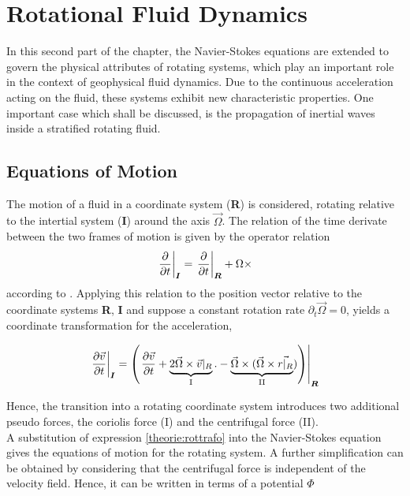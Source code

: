 \section{Rotational Fluid Dynamics}

In this second part of the chapter, the Navier-Stokes equations are extended to govern the physical attributes of rotating systems,
which play an important role in the context of geophysical fluid dynamics.
Due to the continuous acceleration acting on the fluid, these systems exhibit new characteristic properties.
One important case which shall be discussed, is the propagation of inertial waves inside a stratified rotating fluid.

\subsection{Equations of Motion}
\label{THEORIE:ROT}

The motion of a fluid in a coordinate system (\textbf{R}) is considered, rotating relative to the intertial system (\textbf{I}) around the axis $\vec{\Omega}$.
The relation of the time derivate between the two frames of motion is given by the operator relation
\begin{align}
    \left.{\pdn[]{t}}\right|_{\bm{I}} = \left.\pdn[]{t}\right|_{\bm{R}} + \Omega \times
\end{align}
according to \citep{Tilgner2007}.
Applying this relation to the position vector relative to the coordinate systems \textbf{R}, \textbf{I}
and suppose a constant rotation rate $\partial_t\vec{\Omega} = 0$, yields a coordinate transformation for the acceleration,

\begin{align}
    \label{theorie:rottrafo}
    \left.\pdn[\vec{v}]{t}\right|_{\bm{I}} = \left(\left.\pdn[\vec{v}]{t}  + \underbrace{2\vec{\Omega} \times \vec{v}|_R}_{\text{I}}.
    - \underbrace{\vec{\Omega} \times (\vec{\Omega} \times \vec{r|_R}}_{\text{II}})\right)\right|_{\bm{R}}
\end{align}

Hence, the transition into a rotating coordinate system introduces two additional pseudo forces, the coriolis force (I)  and the centrifugal force (II).\\
A substitution of expression \ref{theorie:rottrafo} into the Navier-Stokes equation gives the equations of motion for the rotating system.
A further simplification can be obtained by considering that the centrifugal force is independent of the velocity field.
Hence, it can be written in terms of a potential $\Phi$

